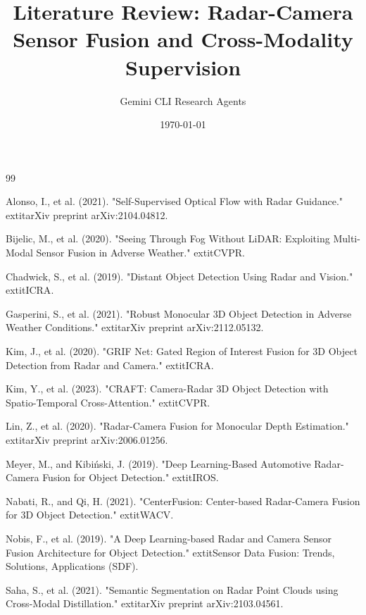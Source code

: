 \documentclass{article}
\title{Literature Review: Radar-Camera Sensor Fusion and Cross-Modality Supervision}
\author{Gemini CLI Research Agents}
\date{\today}
\begin{document}
\maketitle




\begin{thebibliography}{99}

 Alonso, I., et al. (2021). "Self-Supervised Optical Flow with Radar Guidance." 	extit{arXiv preprint arXiv:2104.04812}.

 Bijelic, M., et al. (2020). "Seeing Through Fog Without LiDAR: Exploiting Multi-Modal Sensor Fusion in Adverse Weather." 	extit{CVPR}.

 Chadwick, S., et al. (2019). "Distant Object Detection Using Radar and Vision." 	extit{ICRA}.

 Gasperini, S., et al. (2021). "Robust Monocular 3D Object Detection in Adverse Weather Conditions." 	extit{arXiv preprint arXiv:2112.05132}.

 Kim, J., et al. (2020). "GRIF Net: Gated Region of Interest Fusion for 3D Object Detection from Radar and Camera." 	extit{ICRA}.

 Kim, Y., et al. (2023). "CRAFT: Camera-Radar 3D Object Detection with Spatio-Temporal Cross-Attention." 	extit{CVPR}.

 Lin, Z., et al. (2020). "Radar-Camera Fusion for Monocular Depth Estimation." 	extit{arXiv preprint arXiv:2006.01256}.

 Meyer, M., and Kibiński, J. (2019). "Deep Learning-Based Automotive Radar-Camera Fusion for Object Detection." 	extit{IROS}.

 Nabati, R., and Qi, H. (2021). "CenterFusion: Center-based Radar-Camera Fusion for 3D Object Detection." 	extit{WACV}.

 Nobis, F., et al. (2019). "A Deep Learning-based Radar and Camera Sensor Fusion Architecture for Object Detection." 	extit{Sensor Data Fusion: Trends, Solutions, Applications (SDF)}.

 Saha, S., et al. (2021). "Semantic Segmentation on Radar Point Clouds using Cross-Modal Distillation." 	extit{arXiv preprint arXiv:2103.04561}.

\end{thebibliography}
\end{document}
